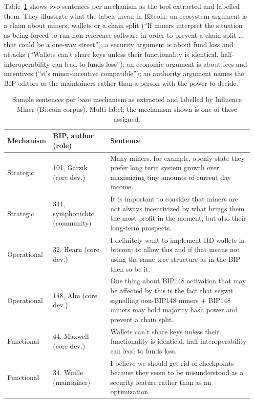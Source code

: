 Table~\ref{tab:samples} shows two sentences per mechanism as the tool extracted and labelled them. They illustrate what the labels mean in Bitcoin: an ecosystem argument is a claim about miners, wallets or a chain split (``If miners interpret the situation as being forced to run non-reference software in order to prevent a chain split \ldots that could be a one-way street''); a security argument is about fund loss and attacks (``Wallets can't share keys unless their functionality is identical, half-interoperability can lead to funds loss''); an economic argument is about fees and incentives (``it's miner-incentive compatible''); an authority argument names the BIP editors or the maintainers rather than a person with the power to decide.

\begin{table}[t]
\caption{Sample sentences per base mechanism as extracted and labelled by Influence Miner (Bitcoin corpus). Multi-label; the mechanism shown is one of those assigned.}
\label{tab:samples}
\small
\begin{tabular}{p{}p{}p{}}
\toprule
Mechanism & BIP, author (role) & Sentence \\
\midrule
Strategic & 101, Garzik (core dev.) & Many miners, for example, openly state they prefer long term system growth over maximizing tiny amounts of current day income. \\
Strategic & 341, symphonicbtc (community) & It is important to consider that miners are not always incentivized by what brings them the most profit in the moment, but also their long-term prospects. \\
Operational & 32, Hearn (core dev.) & I definitely want to implement HD wallets in bitcoinj to allow this and if that means not using the same tree structure as in the BIP then so be it. \\
Operational & 148, Alm (core dev.) & One thing about BIP148 activation that may be affected by this is the fact that segwit signalling non-BIP148 miners + BIP148 miners may hold majority hash power and prevent a chain split. \\
Functional & 44, Maxwell (core dev.) & Wallets can't share keys unless their functionality is identical, half-interoperability can lead to funds loss. \\
Functional & 34, Wuille (maintainer) & I believe we should get rid of checkpoints because they seem to be misunderstood as a security feature rather than as an optimization. \\

\end{tabular}
\end{table}
